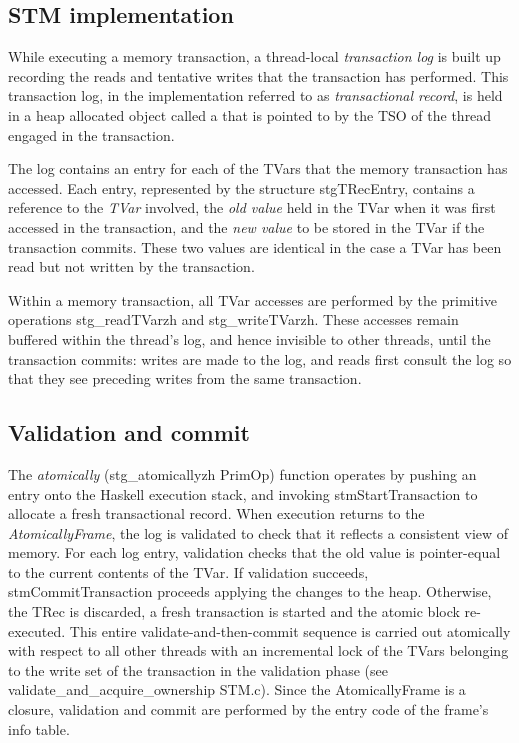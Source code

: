 \subsection{STM implementation}
While executing a memory transaction, a thread-local \emph{transaction log} is built up recording the reads and tentative writes that the transaction has performed. 
This transaction log, in the implementation referred to as \emph{transactional record}, is held in a heap allocated object called a  that is pointed to by the TSO of the thread engaged in the transaction.

The log contains an entry for each of the TVars that the memory transaction has accessed.
Each entry, represented by the structure stgTRecEntry, contains a reference to the \emph{TVar} involved, the \emph{old value} held in the TVar when it was first accessed in the transaction, and the \emph{new value} to be stored in the TVar if the transaction commits.
These two values are identical in the case a TVar has been read but not written by the transaction.

Within a memory transaction, all TVar accesses are performed by the primitive operations stg\_readTVarzh and stg\_writeTVarzh. These accesses remain buffered within the thread’s log, and hence invisible to other threads, until the transaction commits: writes are made to the log, and reads first consult the log so that they see preceding writes from the same transaction.

\subsection{Validation and commit}
The \emph{atomically} (stg\_atomicallyzh PrimOp) function operates by pushing an  entry onto the Haskell execution stack, and invoking stmStartTransaction to allocate a fresh transactional record.
When execution returns to the \emph{AtomicallyFrame}, the log is validated to check that it reflects a consistent view of memory.
For each log entry, validation checks that the old value is pointer-equal to the current contents of the TVar.
If validation succeeds, stmCommitTransaction proceeds applying the changes to the heap. Otherwise, the TRec is discarded, a fresh transaction is started and the atomic block re-executed.
This entire validate-and-then-commit sequence is carried out atomically with respect to all other threads with an incremental lock of the TVars belonging to the write set of the transaction in the validation phase (see validate\_and\_acquire\_ownership STM.c).
Since the AtomicallyFrame is a closure, validation and commit are performed by the entry code of the frame's info table.

